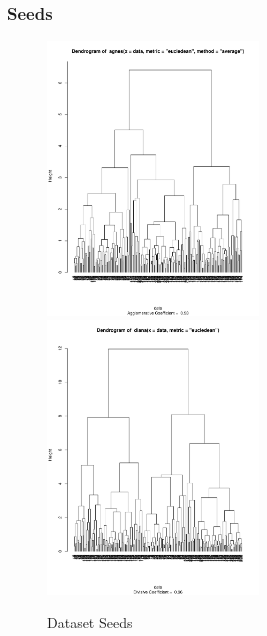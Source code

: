 \documentclass[xcolor={usenames,dvipsnames}, 
	hyperref={
	colorlinks=true, 						%
	linkcolor=black, 						%
	urlcolor=black,							%
	citecolor=black,						%
	pdfpagelabels=false,
	},
	ignorenonframetext,			%
	compress					%
]{beamer}
\begin{document}
\begin{frame}
   \frametitle{Seeds}
\begin{figure}[ht!]
\caption{Dataset Seeds}
\centering
\includegraphics[width=0.5\textwidth]{plots/agnes_diana/agnes_seeds_eucledean_average.pdf}
\hfill  \hfill
\includegraphics[width = 0.5\textwidth]{plots/agnes_diana/diana_seeds_eucledean.pdf}
\end{figure}
\end{frame}
\end{document}
